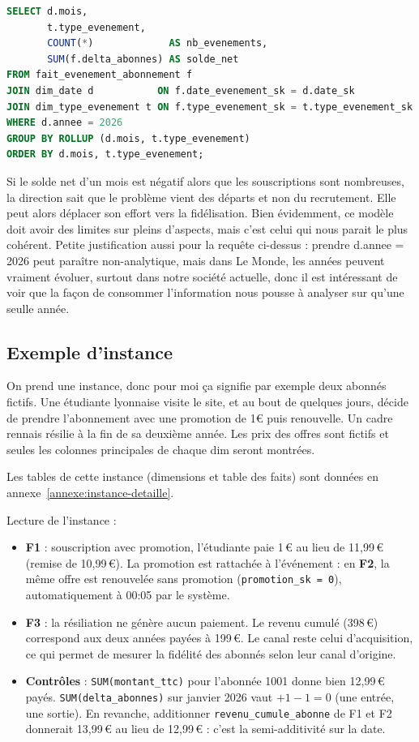\documentclass[a4paper,12pt]{article}
\begin{document}
\begin{lstlisting}[language=SQL]
SELECT d.mois,
       t.type_evenement,
       COUNT(*)             AS nb_evenements,
       SUM(f.delta_abonnes) AS solde_net
FROM fait_evenement_abonnement f
JOIN dim_date d           ON f.date_evenement_sk = d.date_sk
JOIN dim_type_evenement t ON f.type_evenement_sk = t.type_evenement_sk
WHERE d.annee = 2026
GROUP BY ROLLUP (d.mois, t.type_evenement)
ORDER BY d.mois, t.type_evenement;
\end{lstlisting}

Si le solde net d'un mois est négatif alors que les souscriptions sont
nombreuses, la direction sait que le problème vient des départs et non du
recrutement. Elle peut alors déplacer son effort vers la fidélisation. Bien évidemment, ce modèle doit avoir des limites sur pleins d'aspects, mais c'est celui qui nous parait le plus cohérent. Petite justification aussi pour la requête ci-dessus : prendre d.annee = 2026 peut paraître non-analytique, mais dans Le Monde, les années peuvent vraiment évoluer, surtout dans notre société actuelle, donc il est intéressant de voir que la façon de consommer l'information nous pousse à analyser sur qu'une seulle année.

\subsection{Exemple d'instance}

On prend une instance, donc pour moi ça signifie par exemple deux abonnés fictifs. Une étudiante lyonnaise visite le site, et au bout de quelques jours, décide de prendre l’abonnement avec une promotion de 1€ puis renouvelle. Un cadre rennais résilie à la fin de sa deuxième année. Les prix des offres sont fictifs et seules les colonnes principales de chaque dim seront montrées.

Les tables de cette instance (dimensions et table des faits) sont données
en annexe~\ref{annexe:instance-detaille}.

\medskip

\noindent Lecture de l'instance :
\begin{itemize}
  \item \textbf{F1} : souscription avec promotion, l'étudiante paie 1\,€
        au lieu de 11,99\,€ (remise de 10,99\,€). La promotion est
        rattachée à l'événement : en \textbf{F2}, la même offre est
        renouvelée sans promotion (\texttt{promotion\_sk = 0}),
        automatiquement à 00:05 par le système.
  \item \textbf{F3} : la résiliation ne génère aucun paiement. Le revenu
        cumulé (398\,€) correspond aux deux années payées à 199\,€.
        Le canal reste celui d'acquisition, ce qui permet de mesurer la
        fidélité des abonnés selon leur canal d'origine.
  \item \textbf{Contrôles} : \texttt{SUM(montant\_ttc)} pour l'abonnée 1001
        donne bien 12,99\,€ payés. \texttt{SUM(delta\_abonnes)} sur janvier
        2026 vaut $+1 - 1 = 0$ (une entrée, une sortie). En revanche,
        additionner \texttt{revenu\_cumule\_abonne} de F1 et F2 donnerait
        13,99\,€ au lieu de 12,99\,€ : c'est la semi-additivité sur la date.
\end{itemize}
\end{document}
